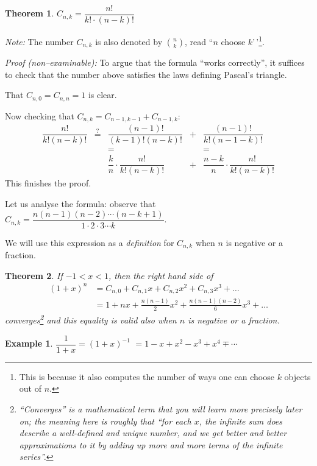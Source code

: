 \documentclass[
  english,
  12pt,
  oneside]{book}
\newtheorem{theorem}{Theorem}[chapter]
\theoremstyle{definition}
\theoremstyle{definition}
\newtheorem{example}{Example}[chapter]
\theoremstyle{definition}
\theoremstyle{definition}
\theoremstyle{remark}
\begin{document}
\begin{theorem}
\(\boxed{C_{n,k} = \dfrac{n!}{k!\cdot (n-k)!}}\)
\end{theorem}

\emph{Note:} The number \(C_{n,k}\) is also denoted by \(\displaystyle{n\choose k}\), read ``\(n\) choose \(k\)'\,'\footnote{This is because it also computes the number of ways one can choose \(k\) objects out of \(n\).}.

\emph{Proof (non--examinable):} To argue that the formula ``works correctly'', it suffices to check that the number above satisfies the laws defining Pascal's triangle.

That \(C_{n,0}=C_{n,n}=1\) is clear.

Now checking that \(C_{n,k}=C_{n-1,k-1}+C_{n-1,k}\):
\[\begin{matrix}
    \dfrac{n!}{k!(n-k)!} &\stackrel{?}{=} & \dfrac{(n-1)!}{(k-1)!(n-k)!} & + & \dfrac{(n-1)!}{k!(n-1-k)!}\\
                        & & = & & = \\
                        & & \dfrac{k}{n}\cdot\dfrac{n!}{k!(n-k)!} & + & \dfrac{n-k}{n}\cdot \dfrac{n!}{k!(n-k)!}
\end{matrix}\]
This finishes the proof.

Let us analyse the formula: observe that \(C_{n,k} = \dfrac{n(n-1)(n-2)\cdots(n-k+1)}{1\cdot 2\cdot 3 \cdots
k}\).

We will use this expression as a \emph{definition} for \(C_{n,k}\) when \(n\) is negative or a fraction.

\begin{theorem}
If \(-1<x<1\), then the right hand side of
\begin{align*}
    (1+x)^n &= C_{n,0}+C_{n,1}x+C_{n,2}x^2 + C_{n,3}x^3 + \dots\\
            &= 1+ nx + \frac{n(n-1)}{2}x^2 + \frac{n(n-1)(n-2)}{6} x^3 + \dots
\end{align*}
converges\footnote{``Converges'' is a mathematical term that you will learn more precisely later on; the meaning here is roughly that ``for each \(x\), the infinite sum \emph{does} describe a well-defined and unique number, and we get better and better approximations to it by adding up more and more terms of the infinite series''.} and this equality is valid also when \(n\) is negative or a fraction.
\end{theorem}

\begin{example}
\(\dfrac{1}{1+x} = (1+x)^{-1}\) \(=1-x+x^2-x^3+x^4 \mp\cdots\)
\end{example}
\end{document}

